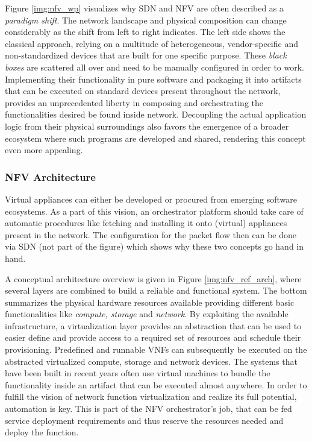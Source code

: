 Figure \ref{img:nfv_wp} visualizes why SDN and NFV are often described as a \textit{paradigm shift}. The network landscape and physical composition can change considerably as the shift from left to right indicates. The left side shows the classical approach, relying on a multitude of heterogeneous, vendor-specific and non-standardized devices that are built for one specific purpose. These \textit{black boxes} are scattered all over and need to be manually configured in order to work. Implementing their functionality in pure software and packaging it into artifacts that can be executed on standard devices present throughout the network, provides an unprecedented liberty in composing and orchestrating the functionalities desired be found inside  network. Decoupling the actual application logic from their physical surroundings also favors the emergence of a broader ecosystem where such programs are developed and shared, rendering this concept even more appealing.

\subsubsection{NFV Architecture}
Virtual appliances can either be developed or procured from emerging software ecosystems. As a part of this vision, an orchestrator platform should take care of automatic procedures like fetching and installing it onto (virtual) appliances present in the network. The configuration for the packet flow then can be done via SDN (not part of the figure) which shows why these two concepts go hand in hand. 

A conceptual architecture overview is given in Figure \ref{img:nfv_ref_arch}, where several layers are combined to build a reliable and functional system. The bottom summarizes the physical hardware resources available providing different basic functionalities like \textit{compute, storage} and \textit{network}. By exploiting the available infrastructure, a virtualization layer provides an abstraction that can be used to easier define and provide access to a required set of resources and schedule their provisioning. Predefined and runnable VNFs can subsequently be executed on the abstracted virtualized compute, storage and network devices. The systems that have been built in recent years often use virtual machines to bundle the functionality inside an artifact that can be executed almost anywhere. In order to fulfill the vision of network function virtualization and realize its full potential, automation is key. This is part of the NFV orchestrator's job, that can be fed service deployment requirements and thus reserve the resources needed and deploy the function.

